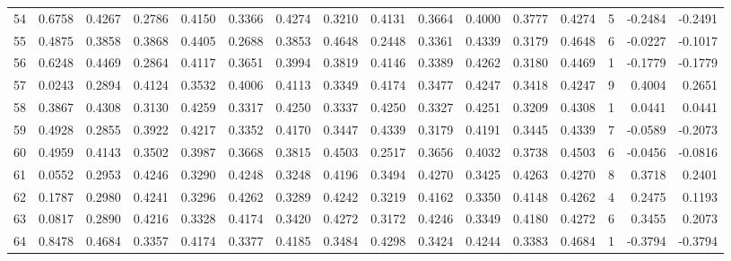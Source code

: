 \begin{tabular}{lrrrrrrrrrrrrrrr}
54  &      0.6758 &  0.4267 &  0.2786 &  0.4150 &  0.3366 &  0.4274 &  0.3210 &  0.4131 &  0.3664 &  0.4000 &   0.3777 &     0.4274 &      5 &                   -0.2484 &                    -0.2491 \\
55  &      0.4875 &  0.3858 &  0.3868 &  0.4405 &  0.2688 &  0.3853 &  0.4648 &  0.2448 &  0.3361 &  0.4339 &   0.3179 &     0.4648 &      6 &                   -0.0227 &                    -0.1017 \\
56  &      0.6248 &  0.4469 &  0.2864 &  0.4117 &  0.3651 &  0.3994 &  0.3819 &  0.4146 &  0.3389 &  0.4262 &   0.3180 &     0.4469 &      1 &                   -0.1779 &                    -0.1779 \\
57  &      0.0243 &  0.2894 &  0.4124 &  0.3532 &  0.4006 &  0.4113 &  0.3349 &  0.4174 &  0.3477 &  0.4247 &   0.3418 &     0.4247 &      9 &                    0.4004 &                     0.2651 \\
58  &      0.3867 &  0.4308 &  0.3130 &  0.4259 &  0.3317 &  0.4250 &  0.3337 &  0.4250 &  0.3327 &  0.4251 &   0.3209 &     0.4308 &      1 &                    0.0441 &                     0.0441 \\
59  &      0.4928 &  0.2855 &  0.3922 &  0.4217 &  0.3352 &  0.4170 &  0.3447 &  0.4339 &  0.3179 &  0.4191 &   0.3445 &     0.4339 &      7 &                   -0.0589 &                    -0.2073 \\
60  &      0.4959 &  0.4143 &  0.3502 &  0.3987 &  0.3668 &  0.3815 &  0.4503 &  0.2517 &  0.3656 &  0.4032 &   0.3738 &     0.4503 &      6 &                   -0.0456 &                    -0.0816 \\
61  &      0.0552 &  0.2953 &  0.4246 &  0.3290 &  0.4248 &  0.3248 &  0.4196 &  0.3494 &  0.4270 &  0.3425 &   0.4263 &     0.4270 &      8 &                    0.3718 &                     0.2401 \\
62  &      0.1787 &  0.2980 &  0.4241 &  0.3296 &  0.4262 &  0.3289 &  0.4242 &  0.3219 &  0.4162 &  0.3350 &   0.4148 &     0.4262 &      4 &                    0.2475 &                     0.1193 \\
63  &      0.0817 &  0.2890 &  0.4216 &  0.3328 &  0.4174 &  0.3420 &  0.4272 &  0.3172 &  0.4246 &  0.3349 &   0.4180 &     0.4272 &      6 &                    0.3455 &                     0.2073 \\
64  &      0.8478 &  0.4684 &  0.3357 &  0.4174 &  0.3377 &  0.4185 &  0.3484 &  0.4298 &  0.3424 &  0.4244 &   0.3383 &     0.4684 &      1 &                   -0.3794 &                    -0.3794 \\

\end{tabular}
